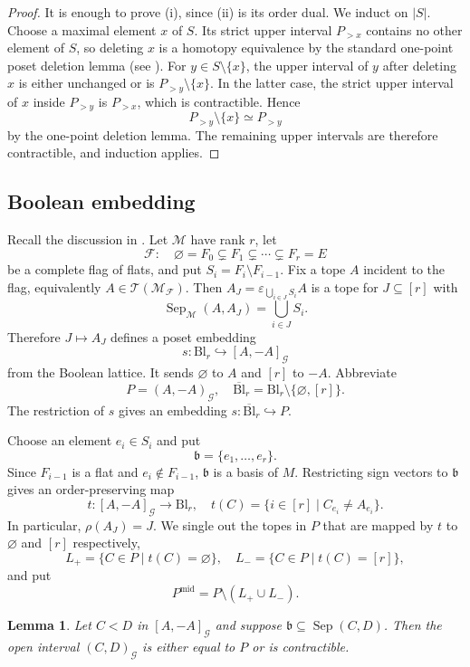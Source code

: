 \documentclass[10pt]{amsart}
\theoremstyle{plain}
\newtheorem{lemma}[theorem]{Lemma}
\theoremstyle{definition}
\newcommand{\T}{\mathcal{T}}
\newcommand{\F}{\mathcal{F}}
\newcommand{\G}{\mathcal{G}}
\newcommand{\Bl}{\mathrm{Bl}}
\newcommand{\M}{\mathcal{M}}
\newcommand{\Sep}{\operatorname{Sep}}
\newcommand{\eps}{\varepsilon}
\newcommand{\bb}{\mathfrak{b}}
\begin{document}
\begin{proof}
It is enough to prove (i), since (ii) is its order dual. We induct on $|S|$. Choose a maximal element $x$ of $S$. Its strict upper interval $P_{>x}$ contains no other element of $S$, so deleting $x$ is a homotopy equivalence by the standard one-point poset deletion lemma (see \cite[Lemma 3.1]{Barmak2011}). For $y\in S\setminus\{x\}$, the upper interval of $y$ after deleting $x$ is either unchanged or is $P_{>y}\setminus\{x\}$. In the latter case, the strict upper interval of $x$ inside $P_{>y}$ is $P_{>x}$, which is contractible. Hence
\[
P_{>y}\setminus\{x\}\simeq P_{>y}
\]
by the one-point deletion lemma. The remaining upper intervals are therefore contractible, and induction applies.
\end{proof}

\subsection{Boolean embedding}

Recall the discussion in . Let $\M$ have rank $r$, let
\[
\F:\quad \varnothing=F_0\subsetneq F_1\subsetneq\cdots\subsetneq F_r=E
\]
be a complete flag of flats, and put $S_i=F_i\setminus F_{i-1}$. Fix a tope $A$ incident to the flag, equivalently $A\in\T(\M_{\mathcal F})$. Then $A_J=\eps_{\bigcup_{i\in J}S_i}A$ is a tope for $J\subseteq[r]$ with
\[
\Sep_\M(A,A_J)=\bigcup_{i\in J}S_i.
\]
Therefore $J\mapsto A_J$ defines a poset embedding
\begin{equation}\label{boolean-embedding}
s:\Bl_r\hookrightarrow [A,-A]_{\G}
\end{equation}
from the Boolean lattice. It sends $\varnothing$ to $A$ and $[r]$ to $-A$. Abbreviate
\[
P=(A,-A)_{\G},\quad \overline{\Bl}_r=\Bl_r\setminus\{\varnothing,[r]\}.
\]
The restriction of $s$ gives an embedding $s:\overline{\Bl}_r\hookrightarrow P$.

Choose an element $e_i\in S_i$ and put
\[
\bb=\{e_1,\ldots,e_r\}.
\]
Since $F_{i-1}$ is a flat and $e_i\notin F_{i-1}$, $\bb$ is a basis of $M$. Restricting sign vectors to $\bb$ gives an order-preserving map
\[
t:[A,-A]_{\G}\to \Bl_r,\quad t(C)=\{i\in[r]\mid C_{e_i}\neq A_{e_i}\}.
\]
In particular, $\rho(A_J)=J$. We single out the topes in $P$ that are mapped by $t$ to $\varnothing$ and $[r]$ respectively,
\[
L_+=\{C\in P\mid t(C)=\varnothing\},\quad L_-=\{C\in P\mid t(C)=[r]\},
\]
and put
\[
P^{\mathrm{mid}}=P\setminus(L_+\cup L_-).
\]

\begin{lemma}\label{basis-separation}
Let $C<D$ in $[A,-A]_{\G}$ and suppose $\bb\subseteq\Sep(C,D)$. Then the open interval $(C,D)_{\G}$ is either equal to $P$ or is contractible.
\end{lemma}
\end{document}
